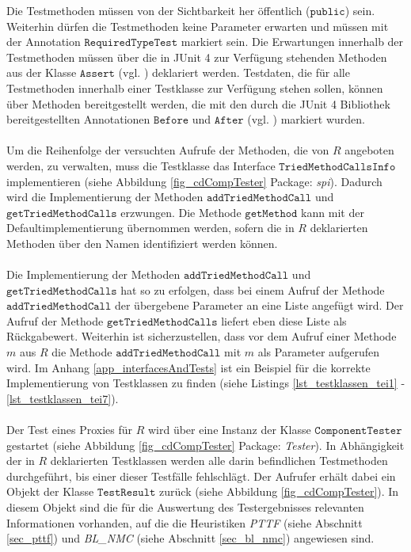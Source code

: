 \noindent
Die Testmethoden müssen von der Sichtbarkeit her öffentlich ($\texttt{public}$) sein. Weiterhin dürfen die Testmethoden keine Parameter erwarten und müssen mit der Annotation $\texttt{RequiredTypeTest}$ markiert sein. Die Erwartungen innerhalb der Testmethoden müssen über die in JUnit 4 zur Verfügung stehenden Methoden aus der Klasse $\texttt{Assert}$ (vgl. \cite{junit_api}) deklariert werden. Testdaten, die für alle Testmethoden innerhalb einer Testklasse zur Verfügung stehen sollen, können über Methoden bereitgestellt werden, die mit den durch die JUnit 4 Bibliothek bereitgestellten Annotationen $\texttt{Before}$ und $\texttt{After}$ (vgl. \cite{junit_api}) markiert wurden.
\\\\
Um die Reihenfolge der versuchten Aufrufe der Methoden, die von $R$ angeboten werden, zu verwalten, muss die Testklasse das \Gls{Interface} $\texttt{TriedMethodCallsInfo}$ implementieren (siehe Abbildung \ref{fig_cdCompTester} Package: \emph{spi}). Dadurch wird die Implementierung der Methoden $\texttt{addTriedMethodCall}$ und $\texttt{getTriedMethodCalls}$ erzwungen. Die Methode $\texttt{getMethod}$ kann mit der Defaultimplementierung übernommen werden, sofern die in $R$ deklarierten Methoden über den Namen identifiziert werden können.
\\\\
Die Implementierung der Methoden $\texttt{addTriedMethodCall}$ und $\texttt{getTriedMethodCalls}$ hat so zu erfolgen, dass bei einem Aufruf der Methode $\texttt{addTriedMethodCall}$ der übergebene Parameter an eine Liste angefügt wird. Der Aufruf der Methode $\texttt{getTriedMethodCalls}$ liefert eben diese Liste als Rückgabewert. Weiterhin ist sicherzustellen, dass vor dem Aufruf einer Methode $m$ aus $R$ die Methode $\texttt{addTriedMethodCall}$ mit $m$ als Parameter aufgerufen wird. Im Anhang \ref{app_interfacesAndTests} ist ein Beispiel für die korrekte Implementierung von Testklassen zu finden (siehe Listings \ref{lst_testklassen_tei1} - \ref{lst_testklassen_tei7}).
\\\\
Der Test eines Proxies für $R$ wird über eine Instanz der Klasse $\texttt{ComponentTester}$ gestartet (siehe Abbildung \ref{fig_cdCompTester} Package: \emph{Tester}). In Abhängigkeit der in $R$ deklarierten Testklassen werden alle darin befindlichen Testmethoden durchgeführt, bis einer dieser Testfälle fehlschlägt. Der Aufrufer erhält dabei ein Objekt der Klasse $\texttt{TestResult}$ zurück (siehe Abbildung \ref{fig_cdCompTester}). In diesem Objekt sind die für die Auswertung des Testergebnisses relevanten Informationen vorhanden, auf die die Heuristiken \emph{PTTF} (siehe Abschnitt \ref{sec_pttf}) und \emph{BL\_NMC} (siehe Abschnitt \ref{sec_bl_nmc}) angewiesen sind.
